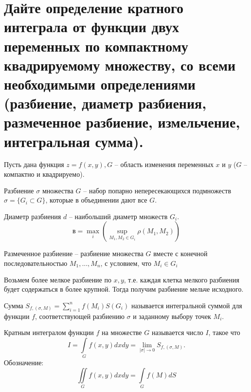 \section{Дайте определение кратного интеграла от функции двух переменных по компактному квадрируемому множеству, со всеми необходимыми определениями (разбиение, диаметр разбиения, размеченное разбиение, измельчение, интегральная сумма).}
Пусть дана функция $z = f(x,y), G$ -- область изменения переменных $x$ и $y$ ($G$ -- компактно и квадрируемо).
\begin{definition}
    Разбиение $\sigma$ множества $G$ -- набор попарно непересекающихся подмножеств $\sigma = \{G_i \subset G\}$, которые в объединении дают все $G$.
\end{definition}
\begin{definition}
    Диаметр разбиения $d$ -- наибольший диаметр множеств $G_i$.
    \[
        в = \max_{i} ( \sup_{M_1, M_2 \in G_i} \rho(M_1, M_2))
    \]
\end{definition}
\begin{definition}
    Размеченное разбиение -- разбиение множества $G$ вместе с конечной последовательностью $M_1, ..., M_n$, с условием, что $M_i \in G_i$
\end{definition}
\begin{definition}
    Возьмем более мелкое разбиение по $x,y$, т.е. каждая клетка мелкого разбиения будет содержаться в более крупной. Тогда получим разбиение мельче исходного.
\end{definition}
\begin{definition}
    Сумма $S_{f, (\sigma, M)} = \sum_{i=1}^n f(M_i) S(G_i)$ называется интегральной суммой для функции $f$, соответствующей разбиению $\sigma$ и заданному выбору точек $M_i$.
\end{definition}
\begin{definition}
    Кратным интегралом функции $f$ на множестве $G$ называется число $I$, такое что
    \[
        I = \int \limits_{G} f(x,y) dx dy = \lim_{|\sigma| \to 0} S_{f, (\sigma, M)}.
    \]
    Обозначение:
    \[
        \iint \limits_{G} f(x,y) dx dy = \int \limits_G f(M) dS
    \]
\end{definition}